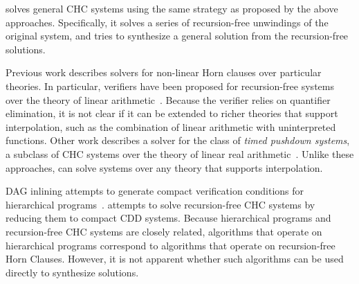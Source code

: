 \sys solves general CHC systems using the same strategy as proposed by
the above approaches.
%
Specifically, it solves a series of recursion-free unwindings of the
original system, and tries to synthesize a general solution from the
recursion-free solutions.

Previous work describes solvers for non-linear Horn clauses over
particular theories.
%
In particular, verifiers have been proposed for recursion-free systems
over the theory of linear arithmetic~\cite{komuravelli14}.
%
Because the verifier relies on quantifier elimination, it is not clear
if it can be extended to richer theories that support interpolation,
such as the combination of linear arithmetic with uninterpreted
functions.
%
Other work describes a solver for the class of \emph{timed pushdown
systems}, a subclass of CHC systems over the theory of linear real
arithmetic~\cite{hoder12}.
%
Unlike these approaches, \sys can solve systems over any theory that
supports interpolation.

DAG inlining attempts to generate compact verification conditions for
hierarchical programs~\cite{lal-qadeer15}.
%
\sys attempts to solve recursion-free CHC systems by reducing them to
compact CDD systems.
%
Because hierarchical programs and recursion-free CHC systems are
closely related, algorithms that operate on hierarchical programs
correspond to algorithms that operate on recursion-free Horn Clauses.
%
However, it is not apparent whether such algorithms can be used directly
to synthesize solutions.
